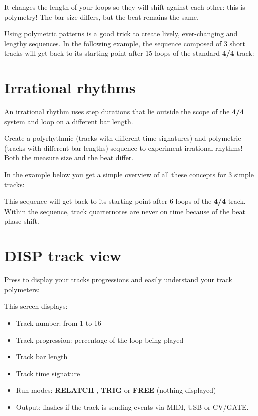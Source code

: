 It changes the length of your loops so they will shift against each other: this is polymetry! The bar size differs, but the beat remains the same.

Using polymetric patterns is a good trick to create lively, ever-changing and lengthy sequences. In the following example, the sequence composed of 3 short tracks will get back to its starting point after 15 loops of the standard \textbf{4/4} track:




\section{Irrational rhythms}

An irrational rhythm uses step durations that lie outside the scope of the \textbf{4/4} system and loop on a different bar length.

Create a polyrhythmic (tracks with different time signatures) and polymetric (tracks with different bar lengths) sequence to experiment irrational rhythms! Both the measure size and the beat differ.

In the example below you get a simple overview of all these concepts for 3 simple tracks:


This sequence will get back to its starting point after 6 loops of the \textbf{4/4} track. Within the sequence, track quarternotes are never on time because of the beat phase shift.


\section{DISP track view}

Press  to display your tracks progressions and easily understand your track polymeters:


This screen displays:

\begin{itemize}
\item Track number: from 1 to 16
\item Track progression: percentage of the loop being played
\item Track bar length
\item Track time signature
\item Run modes: \textbf{RELATCH} , \textbf{TRIG}  or \textbf{FREE} (nothing displayed)
\item Output: flashes if the track is sending events via MIDI, USB or CV/GATE.
\end{itemize}

